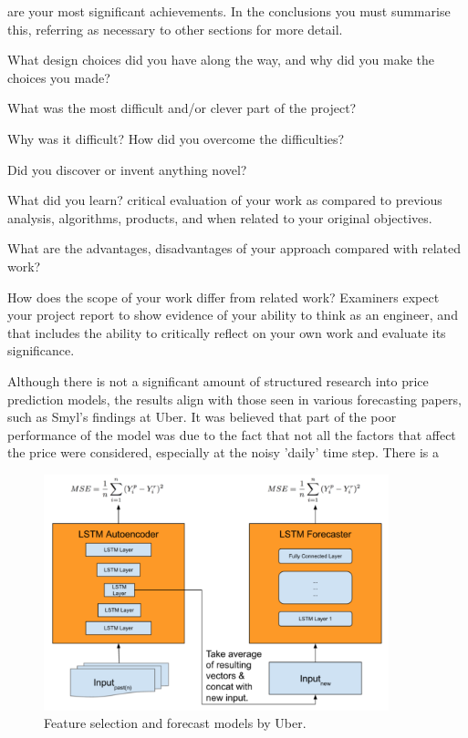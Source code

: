 \documentclass[10pt,onecolumn,letterpaper]{article}
\begin{document}
are your most significant achievements. In the conclusions you must summarise this, referring as necessary to other sections for more detail.

What design choices did you have along the way, and why did you make the choices you made?

What was the most difficult and/or clever part of the project?

Why was it difficult? How did you overcome the difficulties?

Did you discover or invent anything novel?

What did you learn?
critical evaluation of your work as compared to previous analysis, algorithms, products, and when related to your original objectives.

What are the advantages, disadvantages of your approach compared with related work? 

How does the scope of your work differ from related work? Examiners expect your project report to show evidence of your ability to think as an engineer, and that includes the ability to critically reflect on your own work and evaluate its significance. 
\fi


Although there is not a significant amount of structured research into price prediction models, the results align with those seen in various forecasting papers, such as Smyl's findings at Uber. It was believed that part of the poor performance of the model was due to the fact that not all the factors that affect the price were considered, especially at the noisy 'daily' time step. There is a 

\begin{figure}[!hbt!]
\centering
\includegraphics[width=10cm]{uber_architecture}
\caption{Feature selection and forecast models by Uber.}
\label{data_structuring}
\end{figure}
\end{document}
